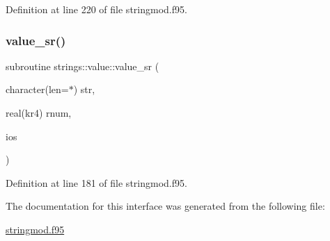 Definition at line 220 of file stringmod.\+f95.

\mbox{\label{interfacestrings_1_1value_a5e6f162c9e02b46a92d20e9e65c9fc36}} 
\subsubsection{\texorpdfstring{value\+\_\+sr()}{value\_sr()}}
{\footnotesize\ttfamily subroutine strings\+::value\+::value\+\_\+sr (\begin{DoxyParamCaption}\item[{character(len=$\ast$)}]{str,  }\item[{real(kr4)}]{rnum,  }\item[{}]{ios }\end{DoxyParamCaption})}



Definition at line 181 of file stringmod.\+f95.



The documentation for this interface was generated from the following file\+:\begin{DoxyCompactItemize}
\item 
\hyperlink{stringmod_8f95}{stringmod.\+f95}\end{DoxyCompactItemize}
